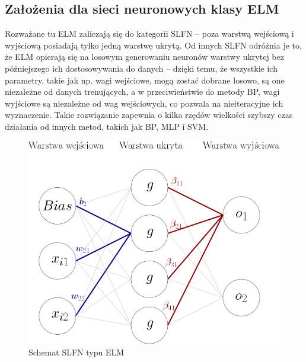 \documentclass{article}
\begin{document}
\subsection{Założenia dla sieci neuronowych klasy ELM}
Rozważane tu ELM zaliczają się do kategorii SLFN -- poza warstwą wejściową i wyjściową posiadają tylko jedną warstwę ukrytą. Od innych SLFN odróżnia je to, że ELM opierają się na losowym generowaniu neuronów warstwy ukrytej bez późniejszego ich dostosowywania do danych -- dzięki temu, że wszystkie ich parametry, takie jak np. wagi wejściowe, mogą zostać dobrane losowo, są one niezależne od danych trenujących, a w przeciwieństwie do metody BP, wagi wyjściowe są niezależne od wag wejściowych, co pozwala na nieiteracyjne ich wyznaczenie. Takie rozwiązanie zapewnia o kilka rzędów wielkości szybszy czas działania od innych metod, takich jak BP, MLP i SVM. 
\begin{figure}[H]
\includegraphics[width=\textwidth]{schemat_sieci.png}
\caption{Schemat SLFN typu ELM}
\end{figure}
\end{document}
